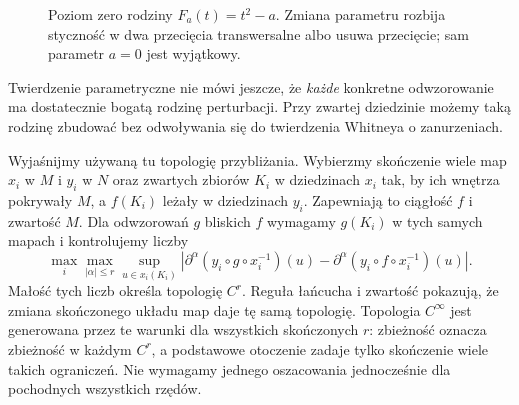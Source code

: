 \begin{figure}[htbp]
\centering
{}
\caption{Poziom zero rodziny $F_a(t)=t^2-a$.
Zmiana parametru rozbija styczność w dwa
przecięcia transwersalne albo usuwa przecięcie;
sam parametr $a=0$ jest wyjątkowy.}
\label{fig:transwersalnosc-perturbacja}
\end{figure}

Twierdzenie parametryczne nie mówi jeszcze, że
\emph{każde} konkretne odwzorowanie ma dostatecznie
bogatą rodzinę perturbacji. Przy zwartej dziedzinie
możemy taką rodzinę zbudować bez odwoływania się
do twierdzenia Whitneya o zanurzeniach.

Wyjaśnijmy używaną tu topologię przybliżania. Wybierzmy
skończenie wiele map $x_i$ w $M$ i $y_i$ w $N$ oraz
zwartych zbiorów $K_i$ w dziedzinach $x_i$ tak, by ich
wnętrza pokrywały $M$, a $f(K_i)$ leżały w dziedzinach $y_i$.
Zapewniają to ciągłość $f$ i zwartość $M$.
Dla odwzorowań $g$ bliskich $f$ wymagamy
$g(K_i)$ w tych samych mapach i kontrolujemy liczby
\[
 \max_i\max_{|\alpha|\leq r}\sup_{u\in x_i(K_i)}
 \left|\partial^\alpha(y_i\circ g\circ x_i^{-1})(u)
       -\partial^\alpha(y_i\circ f\circ x_i^{-1})(u)\right|.
\]
Małość tych liczb określa topologię $C^r$. Reguła łańcucha
i zwartość pokazują, że zmiana skończonego układu map
daje tę samą topologię. Topologia $C^\infty$ jest generowana
przez te warunki dla wszystkich skończonych $r$:
zbieżność oznacza zbieżność w każdym $C^r$, a podstawowe
otoczenie zadaje tylko skończenie wiele takich ograniczeń.
Nie wymagamy jednego oszacowania jednocześnie dla
pochodnych wszystkich rzędów.


